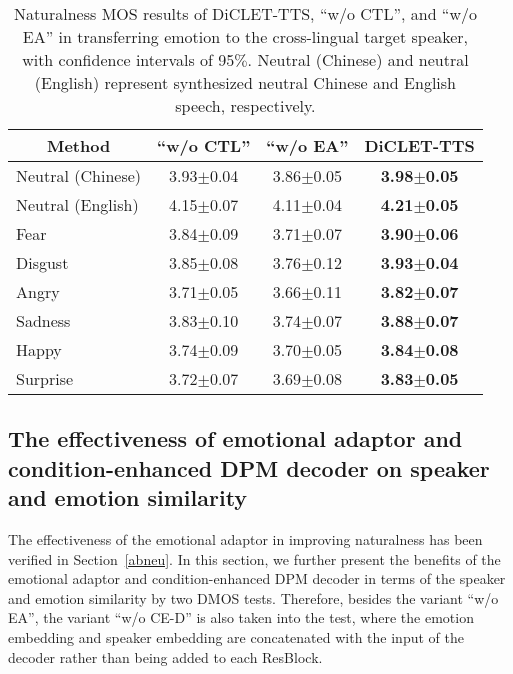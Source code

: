 \documentclass[journal,comsoc]{IEEEtran}
\begin{document}
\begin{table}[htbp]
 \caption{Naturalness MOS results of DiCLET-TTS, ``w/o CTL'', and ``w/o EA'' in transferring emotion to the cross-lingual target speaker, with confidence intervals of 95$\%$. Neutral (Chinese) and neutral (English) represent synthesized neutral Chinese and English speech, respectively.}
 \label{tab:abmos}
\setlength{\tabcolsep}{3mm}
 \centering
\begin{tabular}{l|c|c|c}
\toprule
\multicolumn{1}{c|}{Method} & \multicolumn{1}{c}{``w/o CTL''} & \multicolumn{1}{c}{``w/o EA''} & \multicolumn{1}{c}{DiCLET-TTS} \\ \midrule
Neutral (Chinese)    &3.93$\pm$0.04    &3.86$\pm$0.05    &\bf{3.98}$\pm$0.05   \\
Neutral (English)   &4.15$\pm$0.07         &4.11$\pm$0.04    &\bf{4.21}$\pm$0.05   \\\midrule
Fear                  &3.84$\pm$0.09         &3.71$\pm$0.07    &\bf{3.90}$\pm$0.06   \\
Disgust               &3.85$\pm$0.08         &3.76$\pm$0.12    &\bf{3.93}$\pm$0.04   \\ 
Angry                 &3.71$\pm$0.05         &3.66$\pm$0.11    &\bf{3.82}$\pm$0.07   \\
Sadness               &3.83$\pm$0.10         &3.74$\pm$0.07    &\bf{3.88}$\pm$0.07   \\
Happy                 &3.74$\pm$0.09         &3.70$\pm$0.05    &\bf{3.84}$\pm$0.08    \\
Surprise              &3.72$\pm$0.07         &3.69$\pm$0.08    &\bf{3.83}$\pm$0.05    \\ \bottomrule %
\end{tabular}
\end{table}

\vspace{-0.2cm}
\subsection{The effectiveness of emotional adaptor and condition-enhanced DPM decoder on speaker and emotion similarity}
The effectiveness of the emotional adaptor in improving naturalness has been verified in Section~\ref{abneu}.
In this section, we further present the benefits of the emotional adaptor and condition-enhanced DPM decoder in terms of the speaker and emotion similarity by two DMOS tests.
Therefore, besides the variant ``w/o EA'', the variant ``w/o CE-D'' is also taken into the test, where the emotion embedding and speaker embedding are concatenated with the input of the decoder rather than being added to each ResBlock.
\end{document}
